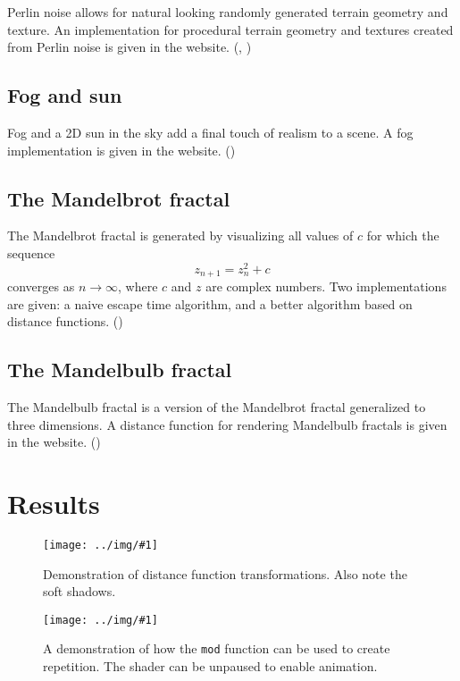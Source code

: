 \documentclass[parskip=half]{scrartcl}
\newcommand\graphic[1]{%
    \centering
    \texttt{[image: ../img/\#1]}%
}
\begin{document}
Perlin noise allows for natural looking randomly generated terrain geometry and
texture. An implementation for procedural terrain geometry and textures created
from Perlin noise is given in the website. (, )

\subsection{Fog and sun}

Fog and a 2D sun in the sky add a final touch of realism to a scene. A fog
implementation is given in the website. ()

\subsection{The Mandelbrot fractal}

The Mandelbrot fractal is generated by visualizing all values of $c$ for which
the sequence
\[
    z_{n+1}=z_n^2+c
\]
converges as $n\to\infty$, where $c$ and $z$ are complex numbers. Two
implementations are given: a naive escape time algorithm, and a better
algorithm based on distance functions. ()

\subsection{The Mandelbulb fractal}

The Mandelbulb fractal is a version of the Mandelbrot fractal generalized to
three dimensions. A distance function for rendering Mandelbulb fractals is
given in the website. ()

\section{Results}

\begin{figure}[H]
    \graphic{shading.png}
    \caption{Demonstration of distance function transformations. Also note the
        soft shadows.}
    \label{shading.png}
\end{figure}

\begin{figure}[H]
    \graphic{infinite-spheres.png}
    \caption{A demonstration of how the \texttt{mod} function can be used to
        create repetition. The shader can be unpaused to enable animation.}
    \label{infinite-spheres.png}
\end{figure}
\end{document}

